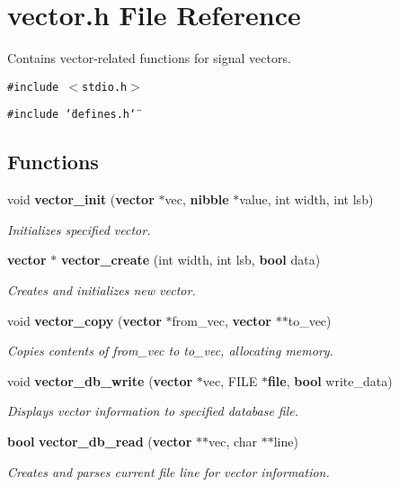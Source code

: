 \section{vector.h File Reference}
\label{vector_8h}
Contains vector-related functions for signal vectors. 


{\tt \#include $<$stdio.h$>$}\par
{\tt \#include \char`\"{}defines.h\char`\"{}}\par
\subsection*{Functions}
\begin{CompactItemize}
\item 
void {\bf vector\_\-init} ({\bf vector} $\ast$vec, {\bf nibble} $\ast$value, int width, int lsb)
\begin{CompactList}\small\item\em Initializes specified vector.\item\end{CompactList}\item 
{\bf vector} $\ast$ {\bf vector\_\-create} (int width, int lsb, {\bf bool} data)
\begin{CompactList}\small\item\em Creates and initializes new vector.\item\end{CompactList}\item 
void {\bf vector\_\-copy} ({\bf vector} $\ast$from\_\-vec, {\bf vector} $\ast$$\ast$to\_\-vec)
\begin{CompactList}\small\item\em Copies contents of from\_\-vec to to\_\-vec, allocating memory.\item\end{CompactList}\item 
void {\bf vector\_\-db\_\-write} ({\bf vector} $\ast$vec, FILE $\ast${\bf file}, {\bf bool} write\_\-data)
\begin{CompactList}\small\item\em Displays vector information to specified database file.\item\end{CompactList}\item 
{\bf bool} {\bf vector\_\-db\_\-read} ({\bf vector} $\ast$$\ast$vec, char $\ast$$\ast$line)
\begin{CompactList}\small\item\em Creates and parses current file line for vector information.\item\end{CompactList}\item 
$$
\end{CompactItemize}
